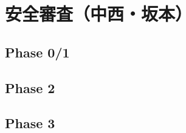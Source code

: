 \chapter{安全審査（中西・坂本）}
\label{chap:safety}

%

\section{Phase 0/1}

\section{Phase 2}

\section{Phase 3}

